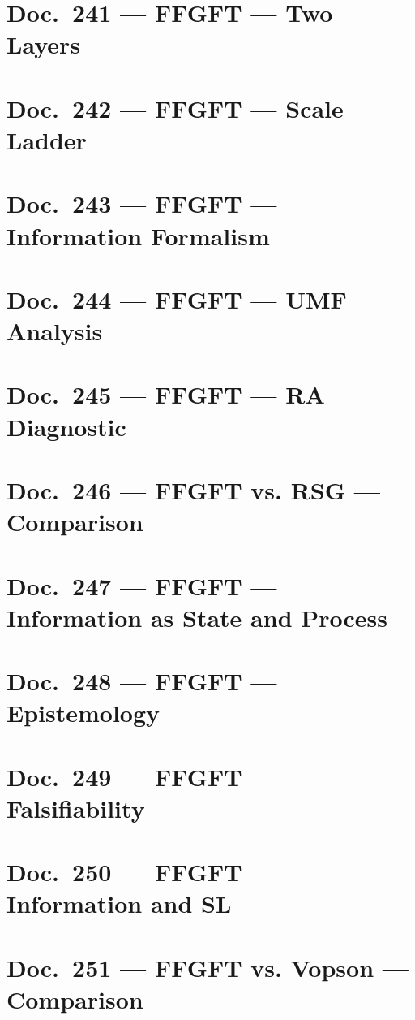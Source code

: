 	\chapter{Doc.~241 --- FFGFT — Two Layers}
	
	\chapter{Doc.~242 --- FFGFT — Scale Ladder}
	
	\chapter{Doc.~243 --- FFGFT — Information Formalism}
	
	\chapter{Doc.~244 --- FFGFT — UMF Analysis}
	
	\chapter{Doc.~245 --- FFGFT — RA Diagnostic}
	
	\chapter{Doc.~246 --- FFGFT vs. RSG — Comparison}
	
	\chapter{Doc.~247 --- FFGFT — Information as State and Process}
	
	\chapter{Doc.~248 --- FFGFT — Epistemology}
	
	\chapter{Doc.~249 --- FFGFT — Falsifiability}
	
	\chapter{Doc.~250 --- FFGFT — Information and SL}
	
	\chapter{Doc.~251 --- FFGFT vs. Vopson — Comparison}
	
